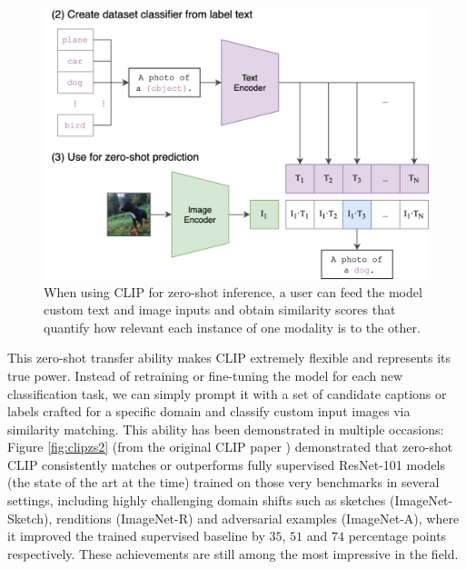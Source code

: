 \documentclass[a4paper, twoside, english]{sapthesis} %
\begin{document}
\begin{figure}[h]
    \centering
    \includegraphics[width=\textwidth]{img/CLIP-zero-shot.png}
    \caption{\normalsize When using CLIP for zero-shot inference, a user can feed the model custom text and image inputs and obtain similarity scores that quantify how relevant each instance of one modality is to the other.}
    \label{fig:clipzs1}
\end{figure}

This zero-shot transfer ability makes CLIP extremely flexible and represents its true power. Instead of retraining or fine-tuning the model for each new classification task, we can simply prompt it with a set of candidate captions or labels crafted for a specific domain and classify custom input images via similarity matching. This ability has been demonstrated in multiple occasions: Figure \ref{fig:clipzs2} (from the original CLIP paper \cite{radford2021learning}) demonstrated that zero-shot CLIP consistently matches or outperforms fully supervised ResNet-101 models (the state of the art at the time) trained on those very benchmarks in several settings, including highly challenging domain shifts such as sketches (ImageNet-Sketch), renditions (ImageNet-R) and adversarial examples (ImageNet-A), where it improved the trained supervised baseline by $35$, $51$ and $74$ percentage points respectively. These achievements are still among the most impressive in the field.
\end{document}
